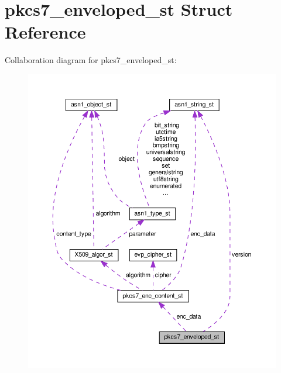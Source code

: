 \hypertarget{structpkcs7__enveloped__st}{}\section{pkcs7\+\_\+enveloped\+\_\+st Struct Reference}
\label{structpkcs7__enveloped__st}


Collaboration diagram for pkcs7\+\_\+enveloped\+\_\+st\+:
\nopagebreak
\begin{figure}[H]
\begin{center}
\leavevmode
\includegraphics[width=350pt]{structpkcs7__enveloped__st__coll__graph}
\end{center}
\end{figure}
